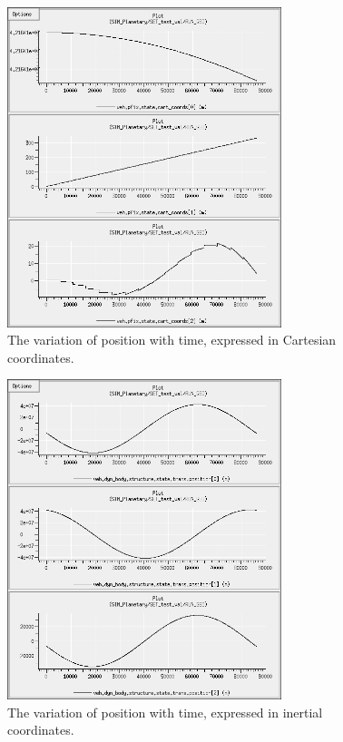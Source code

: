 \begin{description}
\begin{figure}[!ht]
  \begin{center}
        \includegraphics[width=80mm]{figures/planetary_geo_cart.jpg}
        \caption{The variation of position with time, expressed in Cartesian coordinates.} 
        \label{fig:planetarygeocart}
  \end{center}
\end{figure}

\begin{figure}[!ht]
  \begin{center}
        \includegraphics[width=80mm]{figures/planetary_geo_inrtl.jpg}
        \caption{The variation of position with time, expressed in inertial coordinates.} 
        \label{fig:planetarygeoinrtl}
  \end{center}
\end{figure}


\end{description}
